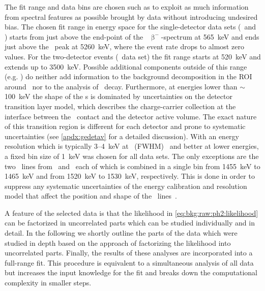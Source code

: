 The fit range and data bins are chosen such as to exploit as much information from
spectral features as possible brought by data without introducing undesired bias. The
chosen fit range in energy space for the single-detector data sets (\enrBEGeII\ and
\enrCoaxII) starts from just above the end-point of the \Arl\ $\upbeta^-$-spectrum at
565~keV and ends just above the \Po\ peak at 5260~keV, where the event rate drops to
almost zero values. For the two-detector events (\enrGeII\ data set) the fit range starts
at 520~keV and extends up to 3500~keV. Possible additional components outside of this
range (e.g. \Arl) do neither add information to the background decomposition in the ROI
around \qbb\ nor to the analysis of \nnbb\ decay. Furthermore, at energies lower than
$\sim$100~keV the shape of the \pdf{}s is dominated by uncertainties on the detector
transition layer model, which describes the charge-carrier collection at the interface
between the \nplus\ contact and the detector active volume. The exact nature of this
transition region is different for each detector and prone to systematic
uncertainties (see \cref{apdx:gedetav} for a detailed discussion).
\newpar
With an energy resolution which is typically 3--4~keV at \qbb\ (FWHM)~\cite{Agostini2018,
Agostini2019a} and better at lower energies, a fixed bin size of 1~keV was chosen for all
data sets. The only exceptions are the two \g\ lines from \kvn\ and \kvz\ each of which is
combined in a single bin from 1455~keV to 1465~keV and from 1520~keV to 1530~keV,
respectively. This is done in order to suppress any systematic uncertainties of the energy
calibration and resolution model that affect the position and shape of the \g\
lines~\cite{Agostini2019}.

A feature of the selected data is that the likelihood in
\cref{eq:bkg:raw:ph2:likelihood} can be factorized in uncorrelated parts which can be
studied individually and in detail. In the following we shortly outline the parts of the
data which were studied in depth based on the approach of factorizing the likelihood into
uncorrelated parts. Finally, the results of these analyses are incorporated into a
full-range fit. This procedure is equivalent to a simultaneous analysis of all data but
increases the input knowledge for the fit and breaks down the computational complexity in
smaller steps.

